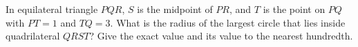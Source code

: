 In equilateral triangle $PQR$, $S$ is the midpoint of $PR$, and $T$ is the point on $PQ$ with $PT=1$ and $TQ=3$. What is the radius of the largest circle that lies inside quadrilateral $QRST$? Give the exact value and its value to the nearest hundredth.
